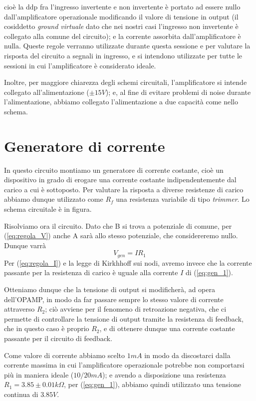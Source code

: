 \documentclass {article}
\begin{document}
cioè la ddp fra l'ingresso invertente e non invertente è portato ad essere nullo dall'amplificatore operazionale modificando il valore di tensione in output (il cosiddetto \textit{ground virtuale} dato che nei nostri casi l'ingresso non invertente è collegato alla comune del circuito); e la corrente assorbita dall'amplificatore è nulla.
Queste regole verranno utilizzate durante questa sessione e per valutare la risposta del circuito a segnali in ingresso, e si intendono utilizzate per tutte le sessioni in cui l'amplificatore è considerato ideale.

Inoltre, per maggiore chiarezza degli schemi circuitali, l'amplificatore si intende collegato all'alimentazione ($\pm 15 V$); e, al fine di evitare problemi di noise durante l'alimentazione, abbiamo collegato l'alimentazione a due capacità come nello schema.

\section{Generatore di corrente}

In questo circuito montiamo un generatore di corrente costante, cioè un dispositivo in grado di erogare una corrente costante indipendentemente dal carico a cui è sottoposto. Per valutare la risposta a diverse resistenze di carico abbiamo dunque utilizzato come $R_f$ una resistenza variabile di tipo \textit{trimmer}. Lo schema circuitale è in figura.

Risolviamo ora il circuito. Dato che B si trova a potenziale di comune, per (\ref{eq:regola_V}) anche A sarà allo stesso potenziale, che considereremo nullo. Dunque varrà
\begin{equation}
V_{gen}=I R_1
\label{eq:gen_1}
\end{equation}
Per (\ref{eq:regola_I}) e la legge di Kirkhhoff sui nodi, avremo invece che la corrente passante per la resistenza di carico è uguale alla corrente $I$ di (\ref{eq:gen_1}).

Otteniamo dunque che la tensione di output si modificherà, ad opera dell'OPAMP, in modo da far passare sempre lo stesso valore di corrente attraverso $R_2$; ciò avviene per il fenomeno di retroazione negativa, che ci permette di controllare la tensione di output tramite la resistenza di feedback, che in questo caso è proprio $R_2$, e di ottenere dunque una corrente costante passante per il circuito di feedback.

Come valore di corrente abbiamo scelto $1 mA$ in modo da discostarci dalla corrente massima in cui l'amplificatore operazionale potrebbe non comportarsi più in maniera ideale ($10/20 mA$); e avendo a disposizione una resistenza $R_1=3.85 \pm 0.01 k\Omega$, per (\ref{eq:gen_1}), abbiamo quindi utilizzato una tensione continua di $3.85 V$.
\end{document}
